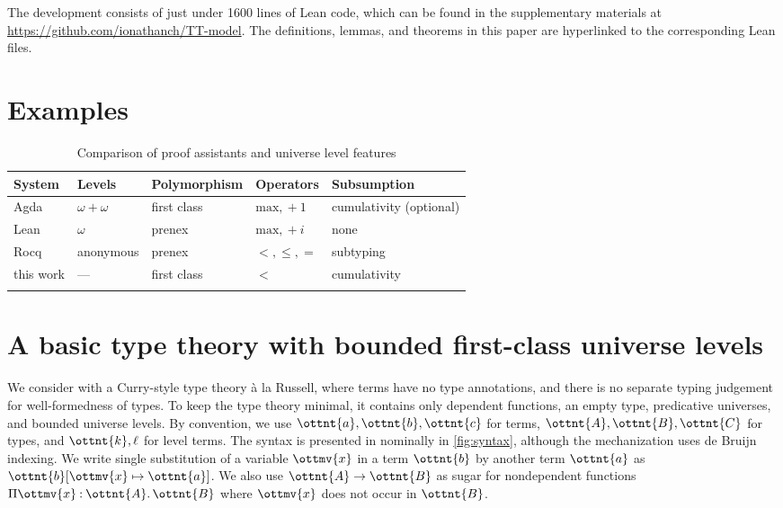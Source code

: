 \documentclass[a4paper,UKenglish,cleveref,autoref,thm-restate]{lipics-v2021}
\newcommand{\repo}{\url{https://github.com/ionathanch/TT-model}}
\begin{document}
The development consists of just under 1600 lines of Lean code,
which can be found in the supplementary materials at \repo{}.
The definitions, lemmas, and theorems in this paper
are hyperlinked to the corresponding Lean files.

\section{Examples}

\begin{table}
\begin{tabular}{lllll}
  \toprule
  System & Levels & Polymorphism & Operators & Subsumption \\
  \midrule
  Agda & $\omega + \omega$ & first class & $\mathrm{max}, {} + 1$ & cumulativity (optional) \\
  Lean & $\omega$ & prenex & $\mathrm{max}, {} + i$ & none \\
  Rocq & anonymous & prenex & $<, \le, =$ & subtyping \\
  this work & --- & first class & $<$ & cumulativity \\
  \bottomrule \\
\end{tabular}
\caption{Comparison of proof assistants and universe level features}
\label{tab:comparison}
\end{table}

\section{A basic type theory with bounded first-class universe levels}

We consider with a Curry-style type theory \`a la Russell,
where terms have no type annotations,
and there is no separate typing judgement for well-formedness of types.
To keep the type theory minimal, it contains only dependent functions,
an empty type, predicative universes, and bounded universe levels.
By convention, we use $\ottnt{a}, \ottnt{b}, \ottnt{c}$ for terms,
$\ottnt{A}, \ottnt{B}, \ottnt{C}$ for types,
and $\ottnt{k}, \ell$ for level terms.
The syntax is presented in nominally in \cref{fig:syntax},
although the mechanization uses de Bruijn indexing.
We write single substitution of a variable $\ottmv{x}$ in a term $\ottnt{b}$ by another term $\ottnt{a}$
as $ \ottnt{b} [  \ottmv{x}  \mapsto  \ottnt{a}  ] $.
We also use $ \ottnt{A}  \to  \ottnt{B} $ as sugar for nondependent functions
$ \Pi  \ottmv{x}  \mathbin{:}  \ottnt{A}  \mathpunct{.}  \ottnt{B} $ where $\ottmv{x}$ does not occur in $\ottnt{B}$.
\end{document}
